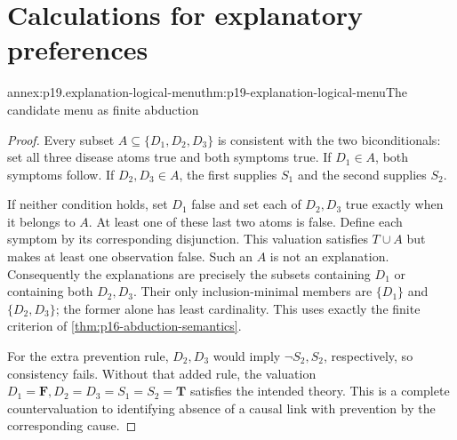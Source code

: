 \chapter{Calculations for explanatory preferences}
\label{annex:p19-explanatory-preferences}

\begin{annexitem}{annex:p19.explanation-logical-menu}{thm:p19-explanation-logical-menu}{The candidate menu as finite abduction}
\begin{proof}
Every subset \(A\subseteq\{D_1,D_2,D_3\}\) is consistent with
the two biconditionals: set all three disease atoms true and
both symptoms true. If \(D_1\in A\), both symptoms follow.
If \(D_2,D_3\in A\), the first supplies \(S_1\) and the
second supplies \(S_2\).

If neither condition holds, set \(D_1\) false and set each
of \(D_2,D_3\) true exactly when it belongs to \(A\).
At least one of these last two atoms is false.
Define each symptom by its corresponding disjunction.
This valuation satisfies \(T\cup A\) but makes at least
one observation false. Such an \(A\) is not an explanation.
Consequently the explanations are precisely the subsets
containing \(D_1\) or containing both \(D_2,D_3\).
Their only inclusion-minimal members are \(\{D_1\}\) and
\(\{D_2,D_3\}\); the former alone has least cardinality.
This uses exactly the finite criterion of
\cref{thm:p16-abduction-semantics}.

For the extra prevention rule, \(D_2,D_3\) would imply
\(\neg S_2,S_2\), respectively, so consistency fails.
Without that added rule, the valuation
\(D_1=\mathbf F,D_2=D_3=S_1=S_2=\mathbf T\) satisfies the
intended theory. This is a complete countervaluation to
identifying absence of a causal link with prevention by
the corresponding cause.
\end{proof}
\end{annexitem}

